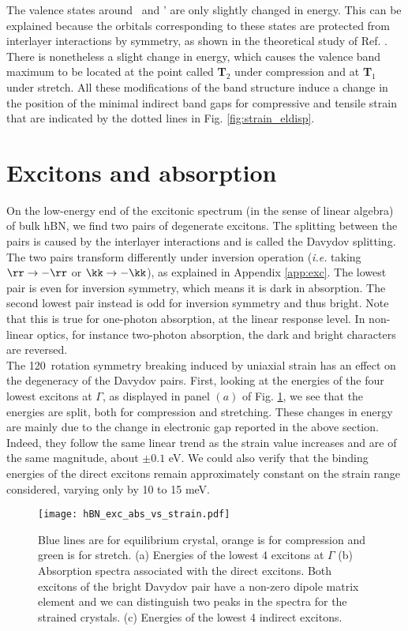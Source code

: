 The valence states around \KK~and \KK' are only slightly changed in energy. This can be explained because the orbitals corresponding to these states are protected from interlayer interactions by symmetry, as shown in the theoretical study of Ref. \cite{kang2016unified}. There is nonetheless a slight change in energy, which causes the valence band maximum to be located at the point called \textbf{T}$_2$ under compression and at \textbf{T}$_1$ under stretch. %
All these modifications of the band structure induce a change in the position of the minimal indirect band gaps for compressive and tensile strain that are indicated by the dotted lines in Fig. \ref{fig:strain_eldisp}.


%
\section{Excitons and absorption}
On the low-energy end of the excitonic spectrum (in the sense of linear algebra) of bulk \acrshort{hBN}, we find two pairs of degenerate excitons. The splitting between the pairs is caused by the interlayer interactions and is called the Davydov splitting.\cite{paleari2018excitons} The two pairs transform differently under inversion operation (\textit{i.e.} taking $\rr \to -\rr$ or $\kk \to -\kk$), as explained in Appendix \ref{app:exc}. The lowest pair is even for inversion symmetry, which means it is dark in absorption. The second lowest pair instead is odd for inversion symmetry and thus bright.
Note that this is true for one-photon absorption, at the linear response level. In non-linear optics, for instance two-photon absorption, the dark and bright characters are reversed.\cite{attaccalite2018two} \\
The 120\textdegree~rotation symmetry breaking induced by uniaxial strain has an effect on the degeneracy of the Davydov pairs. First, looking at the energies of the four lowest excitons at $\Gamma$, as displayed in panel $(a)$ of Fig. \ref{fig:exc_abs_vs_strain}, we see that the energies are split, both for compression and stretching. 
These changes in energy are mainly due to the change in electronic gap reported in the above section. Indeed, they follow the same linear trend as the strain value increases and are of the same magnitude, about $\pm 0.1$ eV. We could also verify that the binding energies of the direct excitons remain approximately constant on the strain range considered, varying only by 10 to 15 meV.
\begin{figure}[tbp]
	\vspace{0.2cm}
	\setcapindent{2em}
	\centering
	\texttt{[image: hBN\_exc\_abs\_vs\_strain.pdf]}
	\caption{Blue lines are for equilibrium crystal, orange is for compression and green is for stretch. (a) Energies of the lowest 4 excitons at $\Gamma$ (b) Absorption spectra associated with the direct excitons. Both excitons of the bright Davydov pair have a non-zero dipole matrix element and we can distinguish two peaks in the spectra for the strained crystals. (c) Energies of the lowest 4 indirect excitons.}
	\label{fig:exc_abs_vs_strain}
\end{figure}


